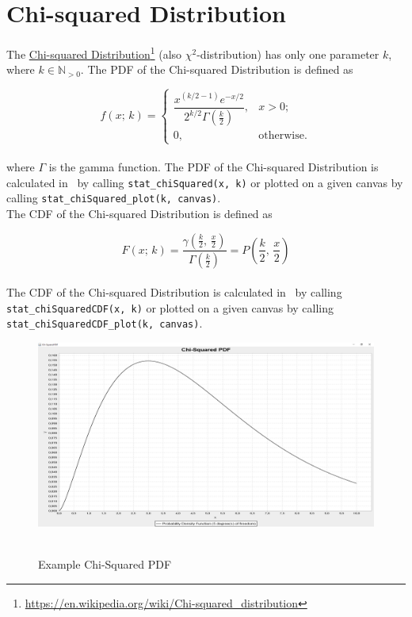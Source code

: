 	\section{Chi-squared Distribution}

		The \href{https://en.wikipedia.org/wiki/Chi-squared_distribution}{Chi-squared Distribution}\footnote{\url{https://en.wikipedia.org/wiki/Chi-squared_distribution}} (also $\chi^2$-distribution) has only one parameter $k$, where $k \in \mathbb{N}_{>0}$. The \ac{PDF} of the Chi-squared Distribution is defined as

		$$f(x;\,k) =
		\begin{cases}
			\dfrac{x^{(k/2-1)} e^{-x/2}}{2^{k/2} \Gamma\left(\frac k 2 \right)},  & x > 0; \\ 0, & \text{otherwise}.
		\end{cases}$$
		\\[0.3cm]
		where $\Gamma$ is the gamma function. The \ac{PDF} of the Chi-squared Distribution is calculated in \setlx\ by calling \lstinline{stat_chiSquared(x, k)} or plotted on a given canvas by calling \lstinline{stat_chiSquared_plot(k, canvas)}.
		\\[0.3cm]
		The \ac{CDF} of the Chi-squared Distribution is defined as

		$$F(x;\,k) = \frac{\gamma(\frac{k}{2},\,\frac{x}{2})}{\Gamma(\frac{k}{2})} = P\left(\frac{k}{2},\,\frac{x}{2}\right)$$
		\\[0.3cm]
		The \ac{CDF} of the Chi-squared Distribution is calculated in \setlx\ by calling \lstinline{stat_chiSquaredCDF(x, k)} or plotted on a given canvas by calling \lstinline{stat_chiSquaredCDF_plot(k, canvas)}.

		\begin{figure}[H]
			\centering
			\includegraphics[width=1\textwidth]{Figures/implemented_functions/chi_squared_pdf}~\\
			\caption{Example Chi-Squared PDF}
			\label{fig:chi_squared_pdf}
		\end{figure}


